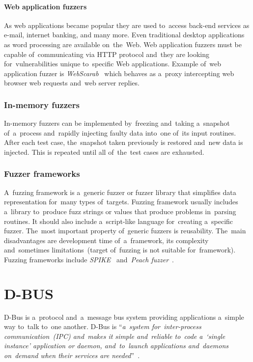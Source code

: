 \subsubsection{Web application fuzzers}
As web applications became popular they are used to~access back-end services
as e-mail, internet banking, and many more. Even traditional desktop applications
as word processing are available on~the~Web. Web application fuzzers must be capable
of~communicating via HTTP protocol and~they are looking for~vulnerabilities
unique to~specific Web applications. Example of~web application fuzzer is
\emph{WebScarab}~\cite{WebScarab} which behaves as a~proxy intercepting web
browser web requests and~web server replies.

\subsection{In-memory fuzzers}
In-memory fuzzers can be implemented by~freezing and~taking a~snapshot
of~a~process and~rapidly injecting faulty data into~one of~its input routines.
After each test case, the~snapshot taken previously is restored and~new data is
injected. This is repeated until all of~the~test cases are exhausted.

\subsection{Fuzzer frameworks}
A~fuzzing framework is a~generic fuzzer or fuzzer library that simplifies data
representation for~many types of~targets. Fuzzing framework usually includes
a~library to~produce fuzz strings or values that produce problems in~parsing
routines. It should also include a~script-like language for~creating a~specific
fuzzer. The~most important property of~generic fuzzers is reusability. The~main
disadvantages are development time of~a~framework, its complexity and~sometimes
limitations~(target of~fuzzing is not suitable for~framework). Fuzzing
frameworks include \emph{SPIKE}~\cite{Aitel} and~\emph{Peach fuzzer}~\cite{Peach}.



\chapter{D-BUS}
D-Bus is a~protocol and~a~message bus system providing applications a~simple way
to~talk to~one another. D-Bus is ``\emph{a~system for~\mbox{inter-process}
communication~(IPC) and~makes it simple and~reliable to~code a~`single instance'
application or daemon, and~to~launch applications and~daemons on~demand when their
services are needed}''~\cite{DBUS}.\\

